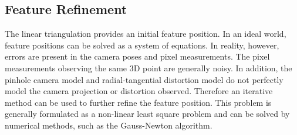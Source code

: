 \subsection{Feature Refinement}
\label{subsec:bundle_adjustment}

The linear triangulation provides an initial feature position. In an ideal
world, feature positions can be solved as a system of equations. In reality,
however, errors are present in the camera poses and pixel measurements. The
pixel measurements observing the same 3D point are generally noisy. In
addition, the pinhole camera model and radial-tangential distortion model do
not perfectly model the camera projection or distortion observed. Therefore an
iterative method can be used to further refine the feature position. This
problem is generally formulated as a non-linear least square problem and can be
solved by numerical methods, such as the Gauss-Newton algorithm.

